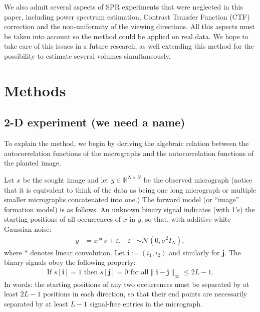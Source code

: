 \documentclass[english,11pt]{article}
\newcommand{\1}{\mathbf{1}}
\newcommand{\TODO}[1]{{\color{red}{[#1]}}}
\numberwithin{equation}{section}
\theoremstyle{plain}
\theoremstyle{definition}
\theoremstyle{remark}
\theoremstyle{plain}
\theoremstyle{remark}
\theoremstyle{plain}
\theoremstyle{plain}
\newcommand{\RNN}{\mathbb{R}^{N\times N}}
\begin{document}
We also admit several aspects of SPR experiments that were neglected in this paper, including power spectrum estimation, Contrast Transfer Function (CTF) correction and the non-uniformity of the viewing directions. All this aspects must be taken into account so the method could be applied on real data. We hope to take care of this issues in a future research, as well extending this method for the possibility to estimate several volumes simultaneously. 
%

\TODO{Where and how do we cite Kam? Fred?}

\section{Methods} \label{sec:methods}

\subsection{2-D experiment (we need a name)}
To explain the method, we begin by deriving the algebraic relation between the autocorrelation functions of the micrographs and the autocorrelation functions of the planted image.

Let $x$ be the sought image and let $y\in\RNN$ be the observed micrograph (notice that it is equivalent to think of the data as being one long micrograph or multiple smaller micrographs concatenated into one.)
The forward model (or ``image'' formation model) is as follows. An unknown binary signal  indicates (with 1's) the starting positions of all occurrences of $x$ in $y$, so that, with additive white Gaussian noise:
\begin{align}
	y & =  x \ast s + \varepsilon, & \varepsilon & \sim \mathcal{N}(0,\sigma^2 I_N),
	\label{eq:model}
\end{align}
where $\ast$ denotes linear convolution. Let $\textbf{i}:=(i_1,i_2)$ and similarly for \textbf{j}.
The binary signals obey the following property: \TODO{Rewrite in terms of $\delta$ functions for consistency with 3D}
\begin{align}
	\textrm{If } s[\textbf{i}] = 1 \textrm{ then } s[\textbf{j}] = 0 \textrm{ for all}  \|\textbf{i}-\textbf{j}\|_\infty\leq 2L-1.
	\label{eq:spacing}
\end{align}
In words: the starting positions of any two occurrences must be separated by at least $2L-1$ positions in each direction, so that their end points are necessarily separated by at least $L-1$ signal-free entries in the micrograph.
\end{document}
